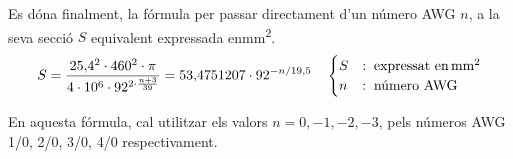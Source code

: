  Es d\'{o}na finalment, la f\'{o}rmula per passar directament d'un n\'{u}mero AWG $n$, a la seva secci\'{o} $S$ equivalent expressada en\unit{mm^2}.
\begin{equation}
   S = \frac{25{,}4^2 \cdot 460^2 \cdot \pi}{4 \cdot 10^6 \cdot 92^{2\cdot\frac{n+3}{39}}} =
   53{,}4751207 \cdot 92^{-n/19{,}5} \quad
\begin{cases}
   S &:\; \text{expressat en\ensuremath{\mathrm{\,mm^2}}} \\
   n &:\; \text{n\'{u}mero AWG}
\end{cases}
\end{equation}

En aquesta f\'{o}rmula, cal utilitzar els valors $n = 0, -1, -2, -3$,  pels n\'{u}meros AWG 1/0,
2/0, 3/0, 4/0 respectivament.
